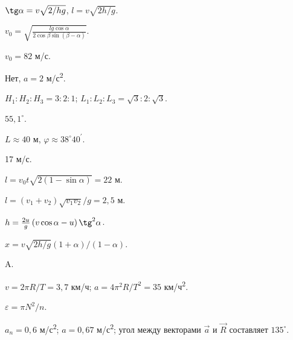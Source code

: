 \begin{Answer}{18}
$\tg \alpha = v \sqrt{2/hg}$, $l = v \sqrt{2h/g}$.
\end{Answer}
\begin{Answer}{19}
$v_0 = \sqrt{\frac{lg \cos \alpha}{2 \cos \beta \sin \left( \beta - \alpha \right)}}$.
\end{Answer}
\begin{Answer}{20}
$v_0 = 82$ м/с.
\end{Answer}
\begin{Answer}{21}
Нет, $a = 2$ м/с\textsuperscript{2}.
\end{Answer}
\begin{Answer}{22}
$H_1 : H_2 : H_3 = 3 : 2 : 1$; $L_1 : L_2 : L_3 = \sqrt{3} : 2 : \sqrt{3}$.
\end{Answer}
\begin{Answer}{23}
$55,1^{ \circ }$.
\end{Answer}
\begin{Answer}{24}
$L \approx 40$ м, $\varphi \approx 38^{\circ}40^\prime$.
\end{Answer}
\begin{Answer}{25}
17 м/с.
\end{Answer}
\begin{Answer}{26}
$l = v_0 t \sqrt{2(1-\sin \alpha)} = 22$ м.
\end{Answer}
\begin{Answer}{27}
$l = (v_1 + v_2)\sqrt{v_1 v_2}/g = 2,5$ м.
\end{Answer}
\begin{Answer}{28}
$h = \frac{2u}{g}\left( v \cos \alpha - u \right) \tg^2 \alpha$.
\end{Answer}
\begin{Answer}{29}
$x = v \sqrt{2h/g} \left( 1 + \alpha \right) / \left( 1 - \alpha \right)$.
\end{Answer}
\begin{Answer}{30}
A.
\end{Answer}
\begin{Answer}{31}
$v = 2 \pi R/T = 3,7$ км/ч; $a = 4\pi^2 R/T^2 = 35$ км/ч\textsuperscript{2}.
\end{Answer}
\begin{Answer}{32}
\end{Answer}
\begin{Answer}{33}
$\varepsilon = \pi N^2/n$.
\end{Answer}
\begin{Answer}{34}
$a_n = 0,6$ м/с\textsuperscript{2}; $a = 0,67$ м/с\textsuperscript{2}; угол между векторами $\vec{a}$ и $\vec{R}$ составляет $135^{\circ}$.
\end{Answer}
